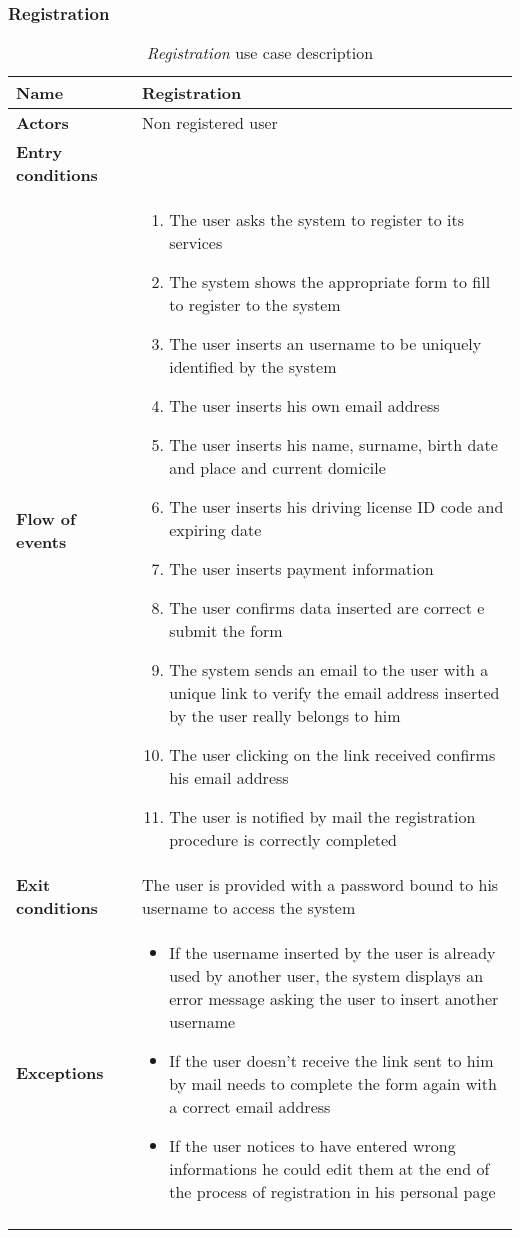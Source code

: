 \subsubsection{Registration}
\begin{longtable}{p{0.25\linewidth}p{0.75\linewidth}}
\toprule
\textbf{Name} & \textbf{Registration} \\
\midrule
\textbf{Actors} & Non registered user \\
\midrule
\textbf{Entry conditions} & \\
\midrule
\textbf{Flow of events} & 
\begin{enumerate}
	\item The user asks the system to register to its services
	\item The system shows the appropriate form to fill to register to the system
	\item The user inserts an username to be uniquely identified by the system
	\item The user inserts his own email address
	\item The user inserts his name, surname, birth date and place and current domicile
	\item The user inserts his driving license ID code and expiring date
	\item The user inserts payment information
	\item The user confirms data inserted are correct e submit the form
	\item The system sends an email to the user with a unique link to verify the email address inserted by the user really belongs to him
	\item The user clicking on the link received confirms his email address
	\item The user is notified by mail the registration procedure is correctly completed
\end{enumerate} \\
\midrule
\textbf{Exit conditions} & The user is provided with a password bound to his username to access the system\\
\midrule
\textbf{Exceptions} & 
\begin{itemize}
	\item If the username inserted by the user is already used by another user, the system displays an error message asking the user to insert another username
	\item If the user doesn't receive the link sent to him by mail needs to complete the form again with a correct email address
	\item If the user notices to have entered wrong informations he could edit them at the end of the process of registration in his personal page
\end{itemize} \\
\bottomrule
\caption{\emph{Registration} use case description}
\end{longtable}

